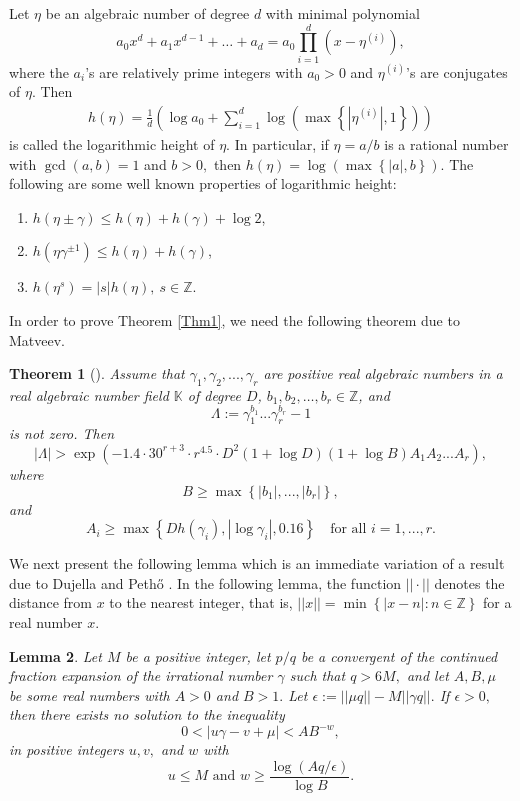 \documentclass[12pt,reqno]{amsart}
\newtheorem{theorem}{Theorem}[section]
\newtheorem{lemma} [theorem]{Lemma}
\begin{document}
Let $\eta $ be an algebraic number of degree $d$ with minimal polynomial 
$$a_{0}x^{d}+a_{1}x^{d-1}+\ldots+a_{d}=a_{0}\prod\limits_{i=1}^{d}\left(x-\eta
^{(i)}\right), $$
where the $a_{i}$'s are relatively prime integers with $a_{0}>0$ and $\eta
^{(i)}$'s are conjugates of $\eta $. Then 
\begin{align*}
  h(\eta )=\frac{1}{d}\left( \log a_{0}+\sum\limits_{i=1}^{d}\log \left( \max
\left\{ |\eta ^{(i)}|,1\right\} \right) \right)  
\end{align*}
is called the logarithmic height of $\eta .$ In particular, if $\eta =a/b$
is a rational number with $\gcd (a,b)=1$ and $b>0,$ then $h(\eta )=\log
\left( \max \left\{ |a|,b\right\} \right)$. The following are some well known properties of logarithmic height:
\begin{enumerate}
    \item[\upshape(1)] $h(\eta \pm \gamma )\leq h(\eta )+h(\gamma )+\log 2$,
    \item[\upshape(2)] $h(\eta \gamma ^{\pm 1})\leq h(\eta )+h(\gamma )$,
    \item[\upshape(3)]$h(\eta ^{s})=|s|h(\eta ),~s\in \mathbb{Z}$. 
\end{enumerate}
In order to prove Theorem \ref{Thm1}, we need the following theorem due to Matveev. 
\begin{theorem}[\cite{r13}]\label{Thm2}
Assume that $\gamma _{1},\gamma _{2},...,\gamma _{r}$ are
positive real algebraic numbers in a real algebraic number field $\mathbb{K}$
of degree $D$, $b_{1},b_{2},\ldots,b_{r}\in \mathbb{Z}$, and 
$$
\Lambda :=\gamma _{1}^{b_{1}}...\gamma _{r}^{b_{r}}-1 $$
is not zero. Then 
$$
|\Lambda |>\exp \left( -1.4\cdot 30^{r+3}\cdot r^{4.5}\cdot D^{2}(1+\log
D)(1+\log B)A_{1}A_{2}...A_{r}\right), $$
where 
$$
B\geq \max \left\{ |b_{1}|,...,|b_{r}|\right\}, 
$$
and 
$$A_{i}\geq \max \left\{ Dh(\gamma _{i}),|\log \gamma _{i}|,0.16\right\}\quad \text{for all } i=1,...,r. $$

\end{theorem}
We next present the following lemma which is an immediate variation of a result due to Dujella and Peth{\H{o}} \cite{r7}. In the following lemma, the function $||\cdot ||$ denotes the
distance from $x$ to the nearest integer, that is, $||x||=\min \left\{
|x-n|:n\in\mathbb{Z}\right\} $ for a real number $x.$

\begin{lemma}\label{Lem1}Let $M$ be a positive integer, let $p/q$ be a convergent of the
continued fraction expansion of the irrational number $\gamma $ such that $q>6M,$ and
let $A,B,\mu $ be some real numbers with $A>0$ and $B>1.$ Let $\epsilon
:=||\mu q||-M||\gamma q||.$ If $\epsilon >0,$ then there exists no solution
to the inequality 
$$
0<|u\gamma -v+\mu |<AB^{-w}, 
$$
in positive integers $u,v,$ and $w$ with 
$$
u\leq M\text{ and }w\geq \frac{\log (Aq/\epsilon )}{\log B}. 
$$
\end{lemma}
\end{document}
